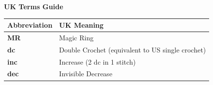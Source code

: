 \noindent\textbf{\color{dinogreen} UK Terms Guide}
\begin{center}
\begin{tabular}{@{}ll@{}}
\toprule
\textbf{Abbreviation} & \textbf{UK Meaning} \\
\midrule
\textbf{MR} & Magic Ring \\
\textbf{dc} & Double Crochet (equivalent to US single crochet) \\
\textbf{inc} & Increase (2 dc in 1 stitch) \\
\textbf{dec} & Invisible Decrease \\
\bottomrule
\end{tabular}
\end{center}
